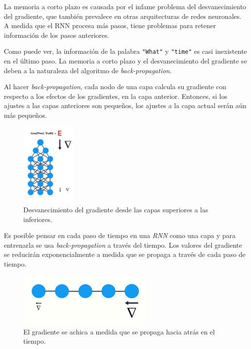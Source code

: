 \documentclass[a4paper,12pt]{article}
\begin{document}
La memoria a corto plazo es causada por el infame problema del desvanecimiento del gradiente, que también prevalece en otras arquitecturas de redes neuronales. A medida que el RNN procesa más pasos, tiene problemas para retener información de los pasos anteriores. 

Como puede ver, la información de la palabra \texttt{"What"} y \texttt{"time"} es casi inexistente en el último paso. La memoria a corto plazo y el desvanecimiento del gradiente se deben a la naturaleza del algoritmo de \textit{back-propagation}.

Al hacer \textit{back-propagation}, cada nodo de una capa calcula su gradiente con respecto a los efectos de los gradientes, en la capa anterior. Entonces, si los ajustes a las capas anteriores son pequeños, los ajustes a la capa actual serán aún más pequeños. 

\begin{figure}[H]
	\begin{center}				
	\includegraphics[width=0.25\textwidth]{vanishing4.png}
  	\caption{Desvanecimiento del gradiente desde las capas superiores a las inferiores.}
  	\label{fig:rnnvanishing4}
  	\end{center}
\end{figure}

Es posible pensar en cada paso de tiempo en una \textit{RNN} como una capa y para entrenarla se usa \textit{back-propagation} a través del tiempo. Los valores del gradiente se reducirán exponencialmente a medida que se propaga a través de cada paso de tiempo.

\begin{figure}[H]
	\begin{center}				
	\includegraphics[width=0.6\textwidth]{vanishing5.png}
  	\caption{El gradiente se achica a medida que se propaga hacia atrás en el tiempo.}
  	\label{fig:rnnvanishing5}
  	\end{center}
\end{figure}
\end{document}
